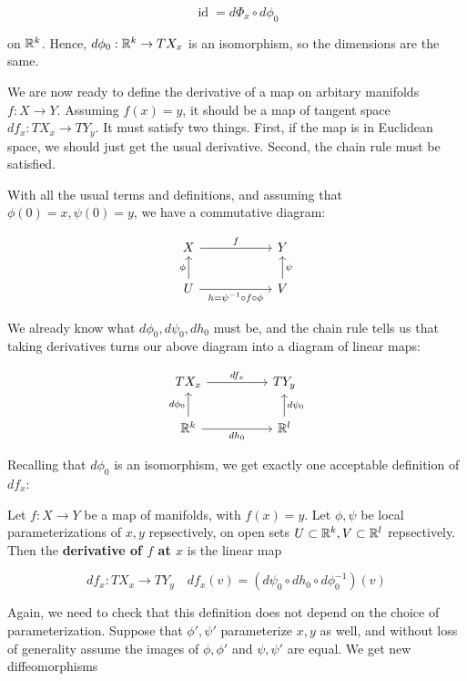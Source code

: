 \[\operatorname{id} = d\Phi_x \circ d\phi_0\]

on $\mathbb{R}^k$. Hence, $d\phi_0: \mathbb{R}^k \to TX_x$ is an isomorphism, so the dimensions are the same. 

We are now ready to define the derivative of a map on arbitary manifolds $f: X \to Y$. Assuming $f(x) = y$, it should be a map of tangent space $df_x: TX_x \to TY_y$. It must satisfy two things. First, if the map is in Euclidean space, we should just get the usual derivative. Second, the chain rule must be satisfied. 

With all the usual terms and definitions, and assuming that $\phi(0) = x, \psi(0) = y$, we have a commutative diagram:

\[\begin{tikzcd}
	X && Y \\
	U & {} & V
	\arrow["f", from=1-1, to=1-3]
	\arrow["\phi", from=2-1, to=1-1]
	\arrow["{h=\psi^{-1} \circ f \circ \phi}"', from=2-1, to=2-3]
	\arrow["\psi"', from=2-3, to=1-3]
\end{tikzcd}\]

We already know what $d\phi_0,d\psi_0,dh_0$ must be, and the chain rule tells us that taking derivatives turns our above diagram into a diagram of linear maps:

\[\begin{tikzcd}
	{TX_x} && {TY_y} \\
	{\R^k} && {\R^l}
	\arrow["{df_x}", from=1-1, to=1-3]
	\arrow["{d\phi_0}", from=2-1, to=1-1]
	\arrow["{dh_0}"', from=2-1, to=2-3]
	\arrow["{d\psi_0}"', from=2-3, to=1-3]
\end{tikzcd}\]

Recalling that $d\phi_0$ is an isomorphism, we get exactly one acceptable definition of $df_x$:

\begin{definition}
    Let $f: X \to Y$ be a map of manifolds, with $f(x) = y$. Let $\phi,\psi$ be local parameterizations of $x,y$ repsectively, on open sets $U \subset \mathbb{R}^k, V \subset \mathbb{R}^l$ repsectively. Then the \textbf{derivative of $f$ at $x$} is the linear map

    \[df_x: TX_x \to TY_y \quad df_x(v) = (d\psi_0 \circ dh_0 \circ d\phi_0^{-1})(v)\]
\end{definition}

Again, we need to check that this definition does not depend on the choice of parameterization. Suppose that $\phi',\psi'$ parameterize $x,y$ as well, and without loss of generality assume the images of $\phi,\phi'$ and $\psi,\psi'$ are equal. We get new diffeomorphisms

